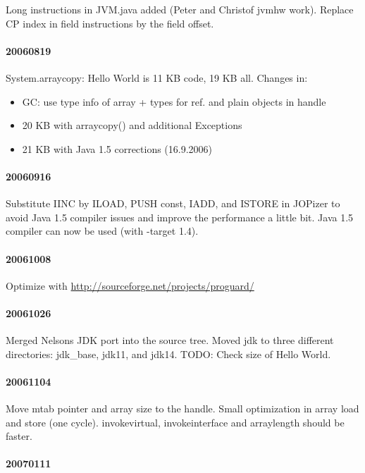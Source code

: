 \documentclass[a4paper,12pt]{scrartcl}
\newcommand{\code}[1]{{\textsf{#1}}}
\begin{document}
Long instructions in JVM.java added (Peter and Christof jvmhw work).
Replace CP index in field instructions by the field offset.

\paragraph{20060819}

System.arraycopy: Hello World is 11 KB code, 19 KB all. Changes in:
\begin{itemize}
    \item GC: use type info of array + types for ref. and plain
        objects in handle
    \item 20 KB with arraycopy() and additional Exceptions
    \item 21 KB with Java 1.5 corrections (16.9.2006)
\end{itemize}

\paragraph{20060916}

Substitute IINC by ILOAD, PUSH const, IADD, and ISTORE in JOPizer to
avoid Java 1.5 compiler issues and improve the performance a little
bit. Java 1.5 compiler can now be used (with -target 1.4).

\paragraph{20061008}

Optimize with \url{http://sourceforge.net/projects/proguard/}

\paragraph{20061026}

Merged Nelsons JDK port into the source tree. Moved \code{jdk} to
three different directories: \code{jdk\_base}, \code{jdk11}, and
\code{jdk14}. TODO: Check size of Hello World.

\paragraph{20061104}

Move mtab pointer and array size to the handle. Small optimization in
array load and store (one cycle). invokevirtual, invokeinterface and
arraylength should be faster.

\paragraph{20070111}
\end{document}
